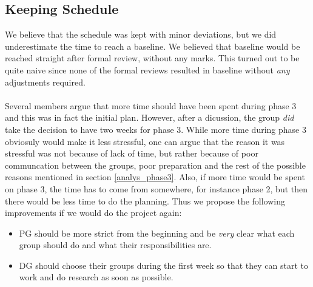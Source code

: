 \documentclass{article}
\begin{document}
    \subsection{Keeping Schedule}
        We believe that the schedule was kept with minor deviations, but we did underestimate the time
        to reach a baseline. We believed that baseline would be reached straight after formal review, without any marks. This turned out to be quite naive since none of the formal reviews resulted in baseline without \emph{any} adjustments required. 
        \\ \\
        Several members argue that more time should have been spent during phase 3 and
        this was in fact the initial plan. However, after a dicussion, the group \emph{did} take
         the decision to have two weeks for phase 3. While more time during phase 3
        obviosuly would make it less stressful, one can argue that the reason it was stressful
        was not because of lack of time, but rather because of poor communcation between the groups,
        poor preparation and the rest of the possible reasons mentioned in section \ref{analys_phase3}. Also, if more time would be spent on phase 3, the time has to come
        from somewhere, for instance phase 2, but then there would be less time to do the planning.
        Thus we propose the following improvements if we would do the project again:
        \begin{itemize}
            \item PG should be more strict from the beginning and be \emph{very} clear what each group
                    should do and what their responsibilities are. 
            \item DG should choose their groups during the first week so that they can start to work
                    and do research as soon as possible.
        \end{itemize}
\end{document}

